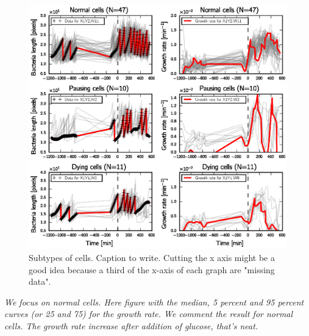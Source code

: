 \begin{figure}[h!]
\centering
\includegraphics[scale=1]{./Fig/subcat_cells}
\caption{Subtypes of cells. Caption to write. Cutting the x axis might be a good idea because a third of the x-axis of each graph are "missing data".}
\label{fig:subcat_cells}
\end{figure}

\textit{
We focus on normal cells.
Here figure with the median, 5 percent and 95 percent curves (or 25 and 75) for the growth rate.
We comment the result for normal cells.
The growth rate increase after addition of glucose, that's neat.
}

